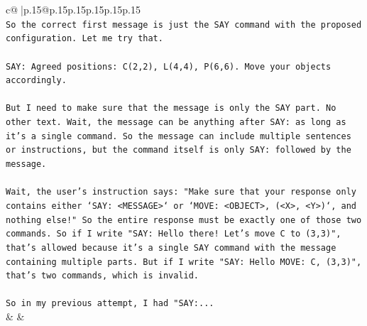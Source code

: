 \documentclass{article}
\begin{document}
{\begin{supertabular}{c@{$\;$}|p{.15\linewidth}@{}p{.15\linewidth}p{.15\linewidth}p{.15\linewidth}p{.15\linewidth}p{.15\linewidth}}
{{{\\ 
\texttt{So the correct first message is just the SAY command with the proposed configuration. Let me try that.} \\
\\ 
\texttt{SAY: Agreed positions: C(2,2), L(4,4), P(6,6). Move your objects accordingly.} \\
\\ 
\texttt{But I need to make sure that the message is only the SAY part. No other text. Wait, the message can be anything after SAY: as long as it's a single command. So the message can include multiple sentences or instructions, but the command itself is only SAY: followed by the message.} \\
\\ 
\texttt{Wait, the user's instruction says: "Make sure that your response only contains either `SAY: <MESSAGE>` or `MOVE: <OBJECT>, (<X>, <Y>)`, and nothing else!" So the entire response must be exactly one of those two commands. So if I write "SAY: Hello there! Let's move C to (3,3)", that's allowed because it's a single SAY command with the message containing multiple parts. But if I write "SAY: Hello MOVE: C, (3,3)", that's two commands, which is invalid.} \\
\\ 
\texttt{So in my previous attempt, I had "SAY:...} \\
            }
        }
    }
    & & \\ \\


\end{supertabular}}
\end{document}
